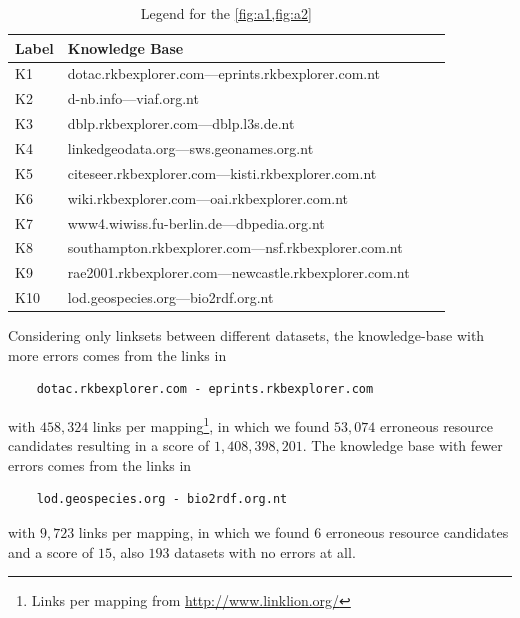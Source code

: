 \begin{table}[H]
	\small
	\centering
	\caption{Legend for the \cref{fig:a1,fig:a2}}
	\label{tab:legends}
	\begin{tabular}{@{}llll@{}}
		\toprule
		Label & Knowledge Base  \\ \midrule
		K1  & dotac.rkbexplorer.com---eprints.rkbexplorer.com.nt      \\
		K2  & d-nb.info---viaf.org.nt                                \\
		K3 & dblp.rkbexplorer.com---dblp.l3s.de.nt                    \\
		K4 & linkedgeodata.org---sws.geonames.org.nt                 \\
		K5 & citeseer.rkbexplorer.com---kisti.rkbexplorer.com.nt     \\
		K6 & wiki.rkbexplorer.com---oai.rkbexplorer.com.nt            \\
		K7 & www4.wiwiss.fu-berlin.de---dbpedia.org.nt                \\
		K8 & southampton.rkbexplorer.com---nsf.rkbexplorer.com.nt    \\
		K9 & rae2001.rkbexplorer.com---newcastle.rkbexplorer.com.nt  \\
		K10 & lod.geospecies.org---bio2rdf.org.nt                    \\ \bottomrule
	\end{tabular}
\end{table}
%

Considering only linksets between different datasets, the knowledge-base with more errors comes from the links in
\begin{verbatim}
    dotac.rkbexplorer.com - eprints.rkbexplorer.com
\end{verbatim}
with $458,324$ links per mapping\footnote{Links per mapping from \url{http://www.linklion.org/}}, in which we found $53,074$ erroneous resource candidates resulting in a score of $1,408,398,201$. The knowledge base with fewer errors comes from the links in
\begin{verbatim}
    lod.geospecies.org - bio2rdf.org.nt
\end{verbatim}
with $9,723$ links per mapping, in which we found $6$ erroneous resource candidates and a score of $15$, also $193$ datasets with no errors at all.

